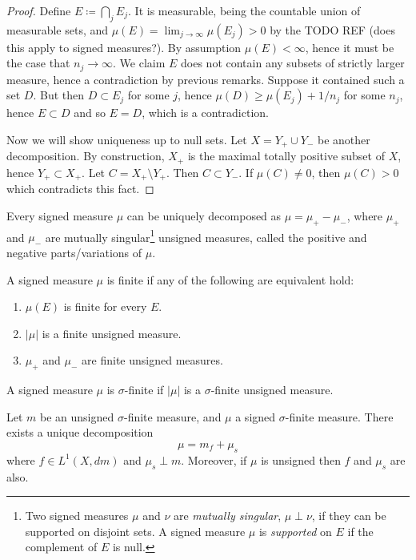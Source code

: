 \documentclass[12pt]{article}
\begin{document}
\begin{proof}
	Define $E\coloneqq\bigcap_j E_j$. It is measurable, being the countable union of measurable sets, and $\mu(E)=\lim_{j\to\infty}\mu(E_j)>0$ by the TODO REF (does this apply to signed measures?). By assumption $\mu(E)<\infty$, hence it must be the case that $n_j\to\infty$. We claim $E$ does not contain any subsets of strictly larger measure, hence a contradiction by previous remarks. Suppose it contained such a set $D$. But then $D\subset E_j$ for some $j$, hence $\mu(D)\geq\mu(E_j)+1/n_j$ for some $n_j$, hence $E\subset D$ and so $E=D$, which is a contradiction.

	Now we will show uniqueness up to null sets. Let $X=Y_+ \cup Y_-$ be another decomposition. By construction, $X_+$ is the maximal totally positive subset of $X$, hence $Y_+\subset X_+$. Let $C=X_+ \setminus Y_+$. Then $C\subset Y_-$. If $\mu(C)\neq 0$, then $\mu(C)>0$ which contradicts this fact. 
\end{proof}

\begin{corollary}
	Every signed measure $\mu$ can be uniquely decomposed as $\mu=\mu_+-\mu_-$, where $\mu_+$ and $\mu_-$ are mutually singular\footnote{Two signed measures $\mu$ and $\nu$ are \emph{mutually singular}, $\mu\perp\nu$, if they can be supported on disjoint sets. A signed measure $\mu$ is \emph{supported} on $E$ if the complement of $E$ is null.} unsigned measures, called the positive and negative parts/variations of $\mu$.
\end{corollary}

\begin{definition}
	A signed measure $\mu$ is finite if any of the following are equivalent hold:
	\begin{enumerate}
		\item $\mu(E)$ is finite for every $E$.
		\item $|\mu|$ is a finite unsigned measure.
		\item $\mu_+$ and $\mu_-$ are finite unsigned measures.
	\end{enumerate}
\end{definition}

\begin{definition}
	A signed measure $\mu$ is $\sigma$-finite if $|\mu|$ is a $\sigma$-finite unsigned measure.
\end{definition}

\begin{theorem}
	Let $m$ be an unsigned $\sigma$-finite measure, and $\mu$ a signed $\sigma$-finite measure. There exists a unique decomposition 
	\begin{equation*}
		\mu=m_f+\mu_s
	\end{equation*}
	where $f\in L^1(X,dm)$ and $\mu_s\perp m$. Moreover, if $\mu$ is unsigned then $f$ and $\mu_s$ are also.
\end{theorem}
\end{document}
